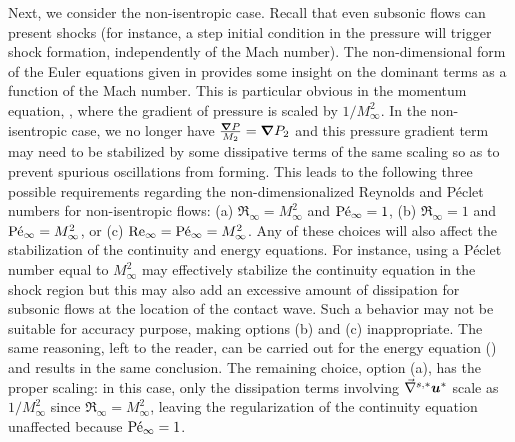 Next, we consider the non-isentropic case. Recall that even subsonic flows can present shocks (for instance, a step initial condition in the pressure will trigger shock formation, independently of the Mach number). The non-dimensional form of the Euler equations given in  provides some insight on the dominant terms as a function of the Mach number. This is particular obvious in the momentum equation, , where the gradient of pressure is scaled by $1/M_\infty^2$. In the non-isentropic case, we no longer have $\frac{\boldsymbol{\nabla} P}{M_2}=\boldsymbol{\nabla} P_2$ and this pressure gradient term may need to be stabilized by some dissipative terms of the same scaling so as to prevent spurious oscillations from forming. This leads to the following three possible requirements regarding the non-dimensionalized Reynolds and P\'eclet numbers for non-isentropic flows: 
(a) $\Re_\infty = M_\infty^2$ and $\textrm{P\'e}_\infty = 1$,
(b) $\Re_\infty = 1$ and $\textrm{P\'e}_\infty = M_\infty^2$, or
(c) $\textrm{Re}_\infty = \textrm{P\'e}_\infty = M_\infty^2$. 
%
Any of these choices will also affect the stabilization of the continuity and energy equations. For instance, using a P\'eclet number equal to $M_\infty^2$ may effectively stabilize the continuity equation in the shock region but this may also add an excessive amount of dissipation for subsonic flows at the location of the contact wave. Such a behavior may not be suitable for accuracy purpose, making options (b) and (c) inappropriate. The same reasoning, left to the reader, can be carried out for the energy equation () and results in the same conclusion. The remaining choice, option (a), has the proper scaling: in this case, only the dissipation terms involving $\vec{\nabla}^{s,*} \boldsymbol u^*$ scale as $1/M_\infty^2$ since $\Re_\infty = M_\infty^2$, leaving the regularization of the continuity equation unaffected because $\textrm{P\'e}_\infty = 1$.
%
%
%
%

